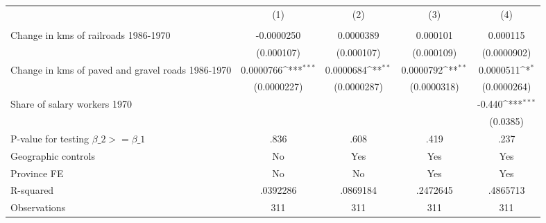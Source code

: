 {
\def\sym#1{\ifmmode^{#1}\else\(^{#1}\)\fi}
\begin{tabular}{l*{4}{c}}
\hline\hline
                &\multicolumn{1}{c}{(1)}&\multicolumn{1}{c}{(2)}&\multicolumn{1}{c}{(3)}&\multicolumn{1}{c}{(4)}\\
                &\multicolumn{1}{c}{}&\multicolumn{1}{c}{}&\multicolumn{1}{c}{}&\multicolumn{1}{c}{}\\
\hline
Change in kms of railroads 1986-1970&-0.0000250         &0.0000389         & 0.000101         & 0.000115         \\
                &(0.000107)         &(0.000107)         &(0.000109)         &(0.0000902)         \\
[1em]
Change in kms of paved and gravel roads 1986-1970&0.0000766\sym{***}&0.0000684\sym{**} &0.0000792\sym{**} &0.0000511\sym{*}  \\
                &(0.0000227)         &(0.0000287)         &(0.0000318)         &(0.0000264)         \\
[1em]
Share of salary workers 1970&                  &                  &                  &   -0.440\sym{***}\\
                &                  &                  &                  & (0.0385)         \\
\hline
P-value for testing $\beta\_{2} >= \beta\_{1}$&     .836         &     .608         &     .419         &     .237         \\
Geographic controls&       No         &      Yes         &      Yes         &      Yes         \\
Province FE     &       No         &       No         &      Yes         &      Yes         \\
R-squared       & .0392286         & .0869184         & .2472645         & .4865713         \\
Observations    &      311         &      311         &      311         &      311         \\
\hline\hline
\end{tabular}
}
